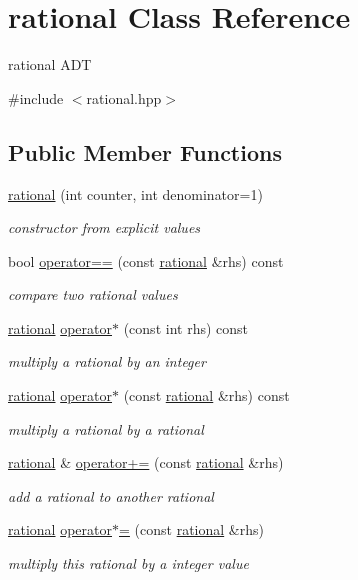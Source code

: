 \hypertarget{classrational}{}\section{rational Class Reference}
\label{classrational}


rational A\+DT  




{\ttfamily \#include $<$rational.\+hpp$>$}

\subsection*{Public Member Functions}
\begin{DoxyCompactItemize}
\item 
\hyperlink{classrational_a5f971ef33181044f54d8e4fee71cb957}{rational} (int counter, int denominator=1)
\begin{DoxyCompactList}\small\item\em constructor from explicit values \end{DoxyCompactList}\item 
bool \hyperlink{classrational_a8b565720ea15ddfb17ea202e27698478}{operator==} (const \hyperlink{classrational}{rational} \&rhs) const
\begin{DoxyCompactList}\small\item\em compare two rational values \end{DoxyCompactList}\item 
\hyperlink{classrational}{rational} \hyperlink{classrational_a9c0f08f8be5db907dc6d93ad3f5cb26b}{operator$\ast$} (const int rhs) const
\begin{DoxyCompactList}\small\item\em multiply a rational by an integer \end{DoxyCompactList}\item 
\hyperlink{classrational}{rational} \hyperlink{classrational_a1dd39ab2daf08ee68087fdbb37be258e}{operator$\ast$} (const \hyperlink{classrational}{rational} \&rhs) const
\begin{DoxyCompactList}\small\item\em multiply a rational by a rational \end{DoxyCompactList}\item 
\hyperlink{classrational}{rational} \& \hyperlink{classrational_a9b83ad0c803d2ac242b42e71d954a356}{operator+=} (const \hyperlink{classrational}{rational} \&rhs)
\begin{DoxyCompactList}\small\item\em add a rational to another rational \end{DoxyCompactList}\item 
\hyperlink{classrational}{rational} \hyperlink{classrational_a2b5729aef261d16cd18ff7c7fcbf8c6e}{operator$\ast$=} (const \hyperlink{classrational}{rational} \&rhs)
\begin{DoxyCompactList}\small\item\em multiply this rational by a integer value \end{DoxyCompactList}\end{DoxyCompactItemize}

